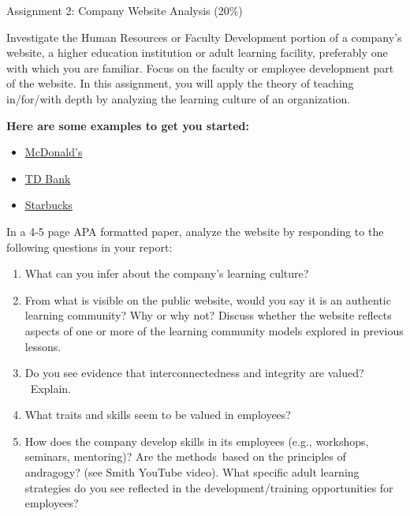 \documentclass[
]{book}
\providecommand{\tightlist}{%
  \setlength{\itemsep}{0pt}\setlength{\parskip}{0pt}}
\begin{document}
\begin{assessment}
{Assignment 2: Company Website Analysis (20\%)}

Investigate the Human Resources or Faculty Development portion of a
company's website, a higher education institution or adult learning
facility, preferably one with which you are familiar. Focus on the
faculty or employee development part of the website. In this assignment,
you will apply the theory of teaching in/for/with depth by analyzing the
learning culture of an organization.

\textbf{Here are some examples to get you started:}

\begin{itemize}
\tightlist
\item
  \href{https://www.mcdonalds.com/ca/en-ca/careers/training-and-benefits.html}{McDonald's}\\
\item
  \href{https://jobs.td.com/en-CA/why-choose-us/training-development/}{TD
  Bank}\\
\item
  \href{https://www.starbucks.com.hk/about-us/become-a-partner/learning-and-development}{Starbucks}
\end{itemize}

In a 4-5 page APA formatted paper, analyze the website by responding to
the following questions in your report:

\begin{enumerate}
\def\labelenumi{\arabic{enumi}.}
\tightlist
\item
  What can you infer about the company's learning culture?\\
\item
  From what is visible on the public website, would you say it is an
  authentic learning community? Why or why not? Discuss whether the
  website reflects aspects of one or more of the learning community
  models explored in previous lessons.\\
\item
  Do you see evidence that interconnectedness and integrity are valued?
  ~Explain.\\
\item
  What traits and skills seem to be valued in employees?\\
\item
  How does the company develop skills in its employees (e.g., workshops,
  seminars, mentoring)? Are the methods~based on the principles of
  andragogy? (see Smith YouTube video). What specific adult learning
  strategies do you see reflected in the development/training
  opportunities for employees?
\end{enumerate}


\end{assessment}
\end{document}
